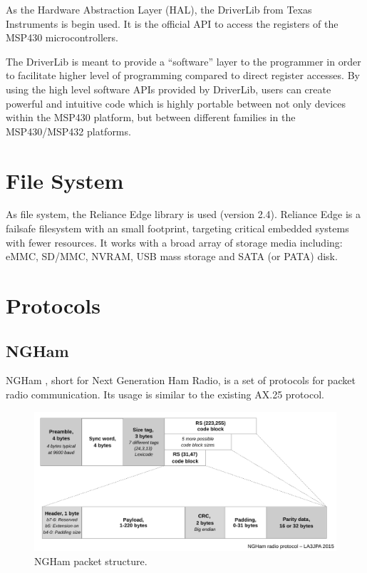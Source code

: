 As the Hardware Abstraction Layer (HAL), the DriverLib \cite{driverlib} from Texas Instruments is begin used. It is the official API to access the registers of the MSP430 microcontrollers.

The DriverLib is meant to provide a ``software'' layer to the programmer in order to facilitate higher level of programming compared to direct register accesses. By using the high level software APIs provided by DriverLib, users can create powerful and intuitive code which is highly portable between not only devices within the MSP430 platform, but between different families in the MSP430/MSP432 platforms.

\section{File System}

As file system, the Reliance Edge library is used \cite{reliance_edge} (version 2.4). Reliance Edge is a failsafe filesystem with an small footprint, targeting critical embedded systems with fewer resources. It works with a broad array of storage media including: eMMC, SD/MMC, NVRAM, USB mass storage and SATA (or PATA) disk.

\section{Protocols}

\subsection{NGHam}

NGHam \cite{ngham}, short for Next Generation Ham Radio, is a set of protocols for packet radio communication. Its usage is similar to the existing AX.25 protocol.

\begin{figure}[!ht]
    \begin{center}
        \includegraphics[width=\textwidth]{figures/ngham_block_v4.pdf}
        \caption{NGHam packet structure.}
        \label{fig:ngham-stack}
    \end{center}
\end{figure}

